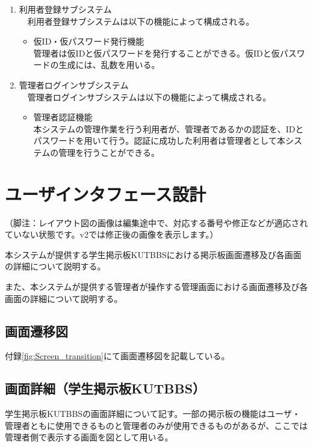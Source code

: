 \documentclass[a4j]{jarticle}
\begin{document}
\begin{enumerate}
  \item 利用者登録サブシステム\\
  　利用者登録サブシステムは以下の機能によって構成される。
  \begin{itemize}
    \item 仮ID・仮パスワード発行機能\\
    管理者は仮IDと仮パスワードを発行することができる。仮IDと仮パスワードの生成には、乱数を用いる。\\
  \end{itemize}


  \item 管理者ログインサブシステム\\
  　管理者ログインサブシステムは以下の機能によって構成される。
  \begin{itemize}
    \item 管理者認証機能\\
    本システムの管理作業を行う利用者が、管理者であるかの認証を、IDとパスワードを用いて行う。認証に成功した利用者は管理者として本システムの管理を行うことができる。
  \end{itemize}

\end{enumerate}



\section{ユーザインタフェース設計}
（脚注：レイアウト図の画像は編集途中で、対応する番号や修正などが適応されていない状態です。v2では修正後の画像を表示します。）

本システムが提供する学生掲示板KUTBBSにおける掲示板画面遷移及び各画面の詳細について説明する。

また、本システムが提供する管理者が操作する管理画面における画面遷移及び各画面の詳細について説明する。

\subsection{画面遷移図}
付録\ref{fig:Screen_transition}にて画面遷移図を記載している。

\subsection{画面詳細（学生掲示板KUTBBS）}
学生掲示板KUTBBSの画面詳細について記す。一部の掲示板の機能はユーザ・管理者ともに使用できるものと管理者のみが使用できるものがあるが、ここでは管理者側で表示する画面を図として用いる。
\end{document}
